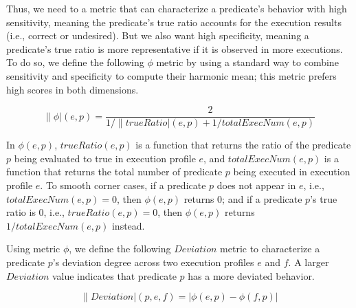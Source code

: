 
Thus, we need to a metric that can characterize
a predicate's behavior with high sensitivity, meaning the predicate's true
ratio accounts for the execution results (i.e., correct or undesired).
But we also want
high specificity, meaning a predicate's true
ratio is more representative if it is observed
in more executions.
To do so, we define the following
$\phi$ metric by using a standard way to
combine sensitivity and specificity to compute their
harmonic mean; this metric prefers high scores in both dimensions. 

\vspace{-3mm}

{\small{
\[
\|\phi|(e, p) = \frac{2}{{1}/{\|trueRatio|(e, p)} + {1}/{totalExecNum(e, p)}}
\]
}}

\vspace{-3mm}

In $\phi(e, p)$, $trueRatio(e, p)$ is a function that returns the ratio of the predicate $p$ being
evaluated to true in execution profile $e$, and $totalExecNum(e, p)$ is a function
that returns the total number of predicate $p$ being executed in execution profile $e$.
To smooth corner cases, if a predicate $p$ does not appear in $e$, i.e., 
$totalExecNum(e, p) = 0$, then $\phi(e, p)$ returns 0; and if a predicate $p$'s true ratio is 0, i.e., $trueRatio(e, p) = 0$, then $\phi(e, p)$ returns
$1/totalExecNum(e, p)$ instead.


Using metric $\phi$, we define the following $Deviation$ metric
to characterize a predicate $p$'s deviation degree across two execution
profiles $e$ and $f$. A larger $Deviation$ value indicates that
predicate $p$ has a more deviated behavior. %

\vspace{-2mm}

{\small{
\[
\|Deviation|(p, e, f) = |\phi(e, p) - \phi(f, p)|
\]
}}
\vspace{-4mm}

